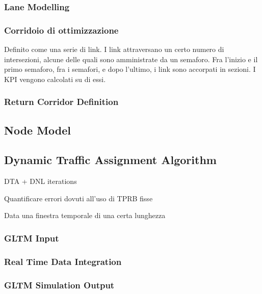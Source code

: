 \subsubsection{Lane Modelling}

\subsubsection{Corridoio di ottimizzazione}
Definito come una serie di link.
I link attraversano un certo numero di intersezioni, alcune delle quali sono amministrate da un semaforo.
Fra l'inizio e il primo semaforo, fra i semafori, e dopo l'ultimo, i link sono accorpati in sezioni. I KPI vengono calcolati su di essi.

\subsubsection*{Return Corridor Definition}




\subsection{Node Model}



\subsection{Dynamic Traffic Assignment Algorithm}

DTA + DNL iterations



Quantificare errori dovuti all'uso di TPRB fisse 

Data una finestra temporale di una certa lunghezza

\subsubsection{GLTM Input}

\subsubsection{Real Time Data Integration}

\subsubsection{GLTM Simulation Output} \label{s:output}



